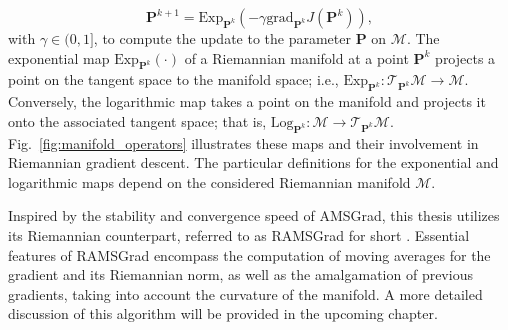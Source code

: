\begin{equation}
	\bm{P}^{k+1}= \text{Exp}_{\bm{P}^k}\left(-\gamma \text{grad}_{\bm{P}^k}J(\bm{P}^k)\right),
\end{equation} 
with $ \gamma \in (0,1]$, to compute the update to the parameter $\bm{P}$ on $\mathcal{M}$. The exponential map $ \text{Exp}_{\bm{P}^k}\left(\cdot\right)$ of a Riemannian manifold at a point $\bm{P}^k$ projects a point on the tangent space to the manifold space; i.e., $ \text{Exp}_{\bm{P}^k}: \mathcal{T}_{\bm{P}^k}\mathcal{M}\rightarrow \mathcal{M}$. Conversely, the logarithmic map takes a point on the manifold and projects it onto the associated tangent space; that is, $ \text{Log}_{\bm{P}^k}: \mathcal{M}\rightarrow \mathcal{T}_{\bm{P}^k}\mathcal{M}$. Fig.~\ref{fig:manifold_operators} illustrates these maps and their involvement in Riemannian gradient descent. The particular definitions for the exponential and logarithmic maps depend on the considered Riemannian manifold $\mathcal{M}$.


Inspired by the stability and convergence speed of AMSGrad, this thesis utilizes its Riemannian counterpart, referred to as RAMSGrad for short \cite{Becigneul2018Riemannianadaptiveoptimization}. Essential features of RAMSGrad encompass the computation of moving averages for the gradient and its Riemannian norm, as well as the amalgamation of previous gradients, taking into account the curvature of the manifold. A more detailed discussion of this algorithm will be provided in the upcoming chapter.





